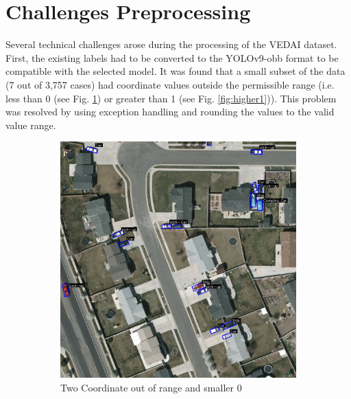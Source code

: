 


\section{Challenges Preprocessing}
Several technical challenges arose during the processing of the VEDAI dataset.
First, the existing labels had to be converted to the \acrshort{YOLO}v9-\acrshort{obb} format to be compatible with the selected model.
It was found that a small subset of the data (7 out of 3,757 cases) had coordinate values outside the permissible range (i.e. less than 0 (see Fig. \ref{fig:smaller0}) or greater than 1 (see Fig. \ref{fig:higher1})). 
This problem was resolved by using exception handling and rounding the values to the valid value range.
 

\begin{figure}[h]
    \centering
    \begin{subfigure}[b]{0.45\textwidth}
        \centering
        \includegraphics[trim={600pt 1000pt 350pt 0pt},clip,width=\textwidth]{images/bb_smaller0.png}
        \caption{Two Coordinate out of range and smaller 0}
        \label{fig:smaller0}
    \end{subfigure}
    \hfill
    \begin{subfigure}[b]{0.45\textwidth}
        \centering

\end{subfigure}
\end{figure}
